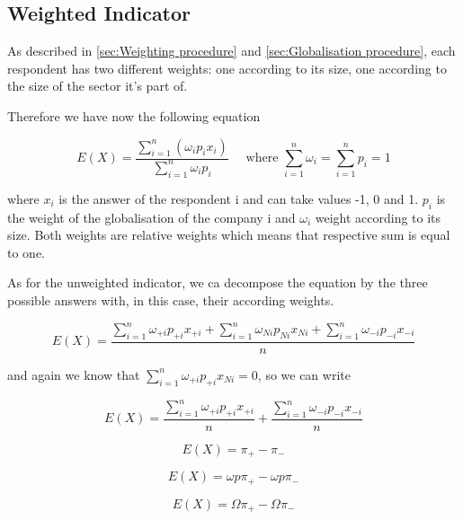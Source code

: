 \documentclass[12pt,a4paper,oneside]{book}
\begin{document}
\subsection{Weighted Indicator}

As described in \autoref{sec:Weighting procedure} and \autoref{sec:Globalisation procedure}, each respondent has two different weights: one according to its size, one according to the size of the sector it's part of.

Therefore we have now the following equation

\begin{equation}
    E(X) = \frac{ \sum_{i=1}^n \left(\omega_i p_i x_i \right)}{\sum_{i=1}^n \omega_i p_i} \quad \text{  where  } \sum_{i=1}^n \omega_i = \sum_{i=1}^n p_i = 1
\end{equation} 

where
$x_i$ is the answer of the respondent i and can take values -1, 0 and 1.
$p_i$ is the weight of the globalisation of the company i and 
$\omega_i$ weight according to its size. Both weights are relative weights which means that respective sum is equal to one.

As for the unweighted indicator, we ca decompose the equation by the three possible answers with, in this case, their according weights.

\begin{equation}
    E(X) = \frac{ \sum_{i=1}^n \omega_{+i} p_{+i} x_{+i} + \sum_{i=1}^n \omega_{Ni} p_{Ni} x_{Ni} + \sum_{i=1}^n \omega_{-i} p_{-i} x_{-i}}{n}
\end{equation}

and again we know that $\sum_{i=1}^n \omega_{+i} p_{+i} x_{Ni} = 0$, so we can write

\begin{equation}
    E(X) = \frac{ \sum_{i=1}^n \omega_{+i} p_{+i} x_{+i}}{n} + \frac{\sum_{i=1}^n \omega_{-i} p_{-i} x_{-i}}{n}
\end{equation} 


\begin{equation}
    E(X) = \pi_+ - \pi_-
\end{equation}

\begin{equation}
    E(X) = \omega p \pi_+ - \omega p \pi_-
\end{equation}

\begin{equation}
    E(X) = \Omega \pi_+ - \Omega \pi_-
\end{equation}
\end{document}
